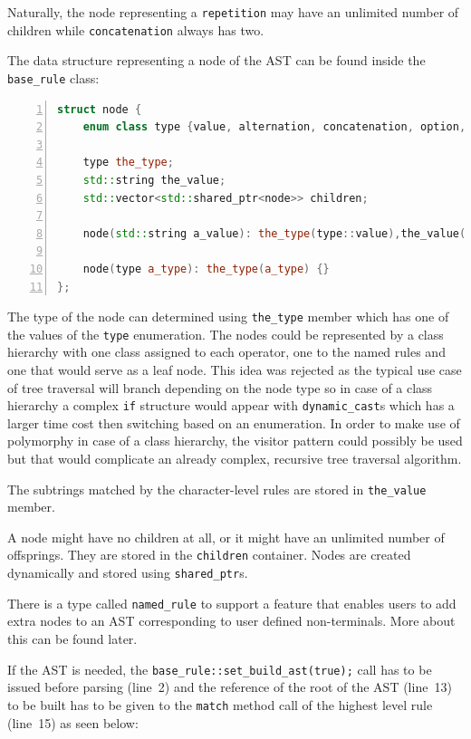 \documentclass[12pt]{article}
\begin{document}
Naturally, the node representing a \texttt{repetition} may have an unlimited number of children while
\texttt{concatenation} always has two.

The data structure representing a node of the AST can be found inside the \texttt{base\_rule} class:
\begin{center}
	\begin{minipage}[h]{0.9\textwidth}
		\begin{lstlisting}[language=C++, breaklines=true, numbers=left]
struct node {
	enum class type {value, alternation, concatenation, option, repetition, repetition_or_epsilon, named_rule};

	type the_type;
	std::string the_value;
	std::vector<std::shared_ptr<node>> children;

	node(std::string a_value): the_type(type::value),the_value(a_value) {}

	node(type a_type): the_type(a_type) {}
};
		\end{lstlisting}
	\end{minipage}
\end{center}

The type of the node can determined using \texttt{the\_type} member which has one of the values of the
\texttt{type} enumeration. The nodes could be represented by a class hierarchy with one class assigned to each
operator, one to the named rules and one that would serve as a leaf node. This idea was rejected as the typical
use case of tree traversal will branch depending on the node type so in case of a class hierarchy a complex
\texttt{if} structure would appear with \texttt{dynamic\_cast}s which has a larger time cost then switching
based on an enumeration. In order to make use of polymorphy in case of a class hierarchy, the visitor pattern
could possibly be used but that would complicate an already complex, recursive tree traversal algorithm.

The subtrings matched by the character-level rules are stored in \texttt{the\_value} member.

A node might have no children at all, or it might have an unlimited number of offsprings. They are stored in
the \texttt{children} container. Nodes are created dynamically and stored using \texttt{shared\_ptr}s. 

There is a type called \texttt{named\_rule} to support a feature that enables users to add extra nodes to an
AST corresponding to user defined non-terminals.  More about this can be found later.

If the AST is needed, the \texttt{base\_rule::set\_build\_ast(true);} call has to be issued before parsing
(line~2) and the reference of the root of the AST (line~13) to be built has to be given to the \texttt{match}
method call of the highest level rule (line~15) as seen below:
\end{document}
